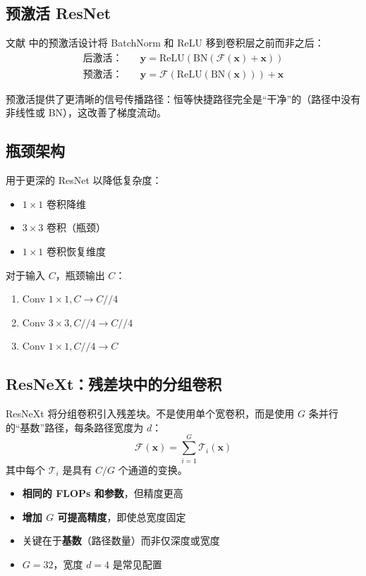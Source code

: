 \subsection{预激活 ResNet}

文献 \cite{he2016identity} 中的预激活设计将 BatchNorm 和 ReLU 移到卷积层之前而非之后：
\begin{align}
\text{后激活：} \quad &\mathbf{y} = \text{ReLU}(\text{BN}(\mathcal{F}(\mathbf{x}) + \mathbf{x})) \\
\text{预激活：} \quad &\mathbf{y} = \mathcal{F}(\text{ReLU}(\text{BN}(\mathbf{x}))) + \mathbf{x}
\end{align}

预激活提供了更清晰的信号传播路径：恒等快捷路径完全是``干净''的（路径中没有非线性或 BN），这改善了梯度流动。

\subsection{瓶颈架构}

用于更深的 ResNet 以降低复杂度：
\begin{itemize}
    \item $1\times1$ 卷积降维
    \item $3\times3$ 卷积（瓶颈）
    \item $1\times1$ 卷积恢复维度
\end{itemize}

对于输入 $C$，瓶颈输出 $C$：
\begin{enumerate}
    \item $\text{Conv }1\times1, C \rightarrow C//4$
    \item $\text{Conv }3\times3, C//4 \rightarrow C//4$
    \item $\text{Conv }1\times1, C//4 \rightarrow C$
\end{enumerate}

\subsection{ResNeXt：残差块中的分组卷积}

ResNeXt \cite{xie2017aggregated} 将分组卷积引入残差块。不是使用单个宽卷积，而是使用 $G$ 条并行的``基数''路径，每条路径宽度为 $d$：
\begin{equation}
\mathcal{F}(\mathbf{x}) = \sum_{i=1}^{G} \mathcal{T}_i(\mathbf{x})
\end{equation}
其中每个 $\mathcal{T}_i$ 是具有 $C/G$ 个通道的变换。

\begin{properties}
\begin{itemize}
    \item \textbf{相同的 FLOPs 和参数}，但精度更高
    \item \textbf{增加 $G$ 可提高精度}，即使总宽度固定
    \item 关键在于\textbf{基数}（路径数量）而非仅深度或宽度
    \item $G = 32$，宽度 $d = 4$ 是常见配置
\end{itemize}
\end{properties}

